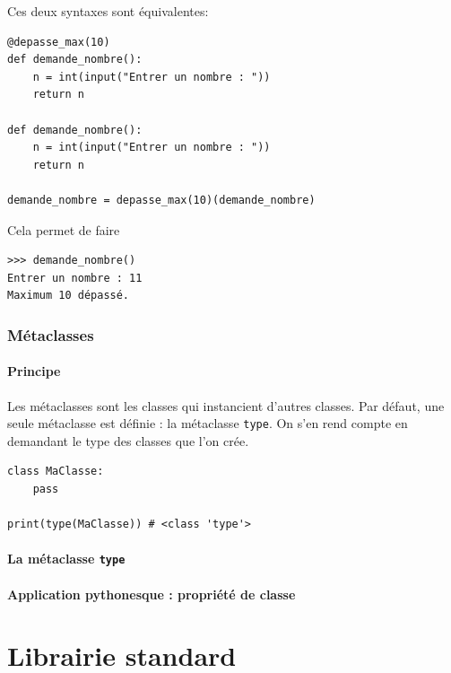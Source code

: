 \documentclass[a4paper, 10pt]{article}
\newcommand{\code}[1]{{\small\texttt{#1}}}
\begin{document}
Ces deux syntaxes sont équivalentes:

\begin{verbatim}
@depasse_max(10)
def demande_nombre():
    n = int(input("Entrer un nombre : "))
    return n

def demande_nombre():
    n = int(input("Entrer un nombre : "))
    return n

demande_nombre = depasse_max(10)(demande_nombre)
\end{verbatim}

Cela permet de faire

\begin{Verbatim}[frame = single, fontsize = \footnotesize]
>>> demande_nombre()
Entrer un nombre : 11
Maximum 10 dépassé.
\end{Verbatim}

\section{Métaclasses}
\subsection{Principe}
\label{sec:metaclasses}
Les métaclasses sont les classes qui instancient d'autres classes. Par défaut, une seule métaclasse est définie : la métaclasse \code{type}. On s'en rend compte en demandant le type des classes que l'on crée.

\begin{verbatim}
class MaClasse:
    pass

print(type(MaClasse)) # <class 'type'>
\end{verbatim}

\subsection{La métaclasse \code{type}}

\subsection{Application \og pythonesque \fg{}: propriété de classe}


\newpage

\part{Librairie standard}
\end{document}
